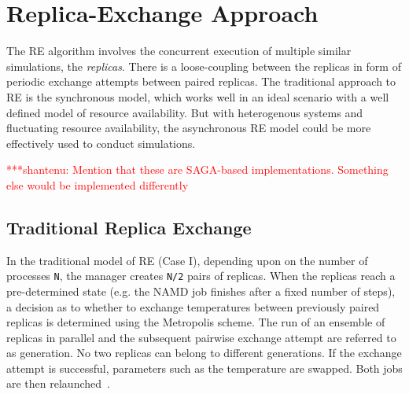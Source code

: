 \documentclass{rspublic}
\newcommand{\jhanote}[1]{ {\textcolor{red} { ***shantenu: #1 }}}
\newcommand{\alnote}[1]{ {\textcolor{blue} { ***andre: #1 }}}
\newcommand{\alnote}[1]{}
\newcommand{\jhanote}[1]{}
\begin{document}
\section{Replica-Exchange Approach}
\label{sec:repex-approach}
The RE algorithm involves the concurrent execution of multiple similar
simulations, the \emph{replicas}.  There is a loose-coupling between
the replicas in form of periodic exchange attempts between paired
replicas. The traditional approach to RE is the synchronous model,
which works well in an ideal scenario with a well defined model of
resource availability. But with heterogenous systems and fluctuating
resource availability, the asynchronous RE model could be more
effectively used to conduct simulations.





\jhanote{Mention that these are SAGA-based implementations. Something
  else would be implemented differently}

\subsection{Traditional Replica Exchange}
In the traditional model of RE (Case I), depending upon
on the number of processes \texttt{N}, the manager creates \texttt{N/2} pairs
of replicas. When the replicas reach a
pre-determined state (e.g. the NAMD job finishes after a fixed number
of steps), a decision as to whether to exchange temperatures between
previously paired replicas is determined using the Metropolis scheme.
The run of an ensemble of replicas in parallel and the subsequent
pairwise exchange attempt are referred to as generation. No two
replicas can belong to different generations. If the exchange attempt
is successful, parameters such as the temperature are swapped. Both
jobs are then relaunched~\citep{Luckow:2008fp}.
\end{document}
